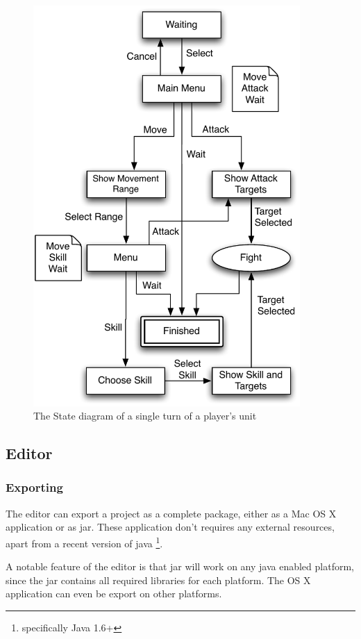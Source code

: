 \begin{figure}[htbp]
	\centering
		\includegraphics[width=4in]{figures/unit.pdf}
	\caption{The State diagram of a single turn of a player's unit}
	\label{fig:figures_unit}
\end{figure}


\subsection{Editor}

\subsubsection{Exporting}

The editor can export a project as a complete package, either as a Mac OS X application or as jar. These application don't requires any external resources, apart from a recent version of java \footnote{specifically Java 1.6+}.

A notable feature of the editor is that jar will work on any java enabled platform, since the jar contains all required libraries for each platform. The OS X application can even be export on other platforms.

